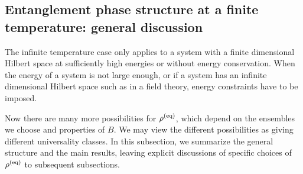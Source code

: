 \documentclass[a4paper,11pt]{article}
\begin{document}






\subsection{Entanglement phase structure at a finite temperature: general discussion} 

The infinite temperature case only applies to a system with a finite dimensional Hilbert space at sufficiently high energies or without energy conservation. When the energy of a system is not large enough, or if a system has an infinite dimensional Hilbert space such as in a field theory, energy constraints have to be imposed. 

Now there are many more possibilities for $\rho^{\rm (eq)}$, which depend on the ensembles we choose and properties of $B$. 
 We may view the different
possibilities as giving different universality classes. %
In this subsection, we summarize the general structure and the main results, leaving explicit discussions of specific choices of $\rho^{\rm (eq)}$
to subsequent subsections. 
\end{document}
